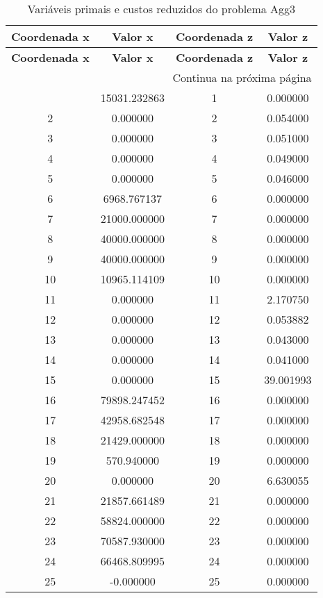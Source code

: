 \documentclass[12pt]{article}
\begin{document}
\begin{longtable}{@{}cccc@{}}
\caption{Variáveis primais e custos reduzidos do problema Agg3} \\
\toprule
\textbf{Coordenada x} & \textbf{Valor x} & \textbf{Coordenada z} & \textbf{Valor z} \\
\midrule
\endfirsthead

\toprule
\textbf{Coordenada x} & \textbf{Valor x} & \textbf{Coordenada z} & \textbf{Valor z} \\
\midrule
\endhead

\midrule \multicolumn{4}{r}{{Continua na próxima página}} \\ \midrule
\endfoot

\bottomrule
\endlastfoot
1 & 15031.232863 & 1 & 0.000000 \\
2 & 0.000000 & 2 & 0.054000 \\
3 & 0.000000 & 3 & 0.051000 \\
4 & 0.000000 & 4 & 0.049000 \\
5 & 0.000000 & 5 & 0.046000 \\
6 & 6968.767137 & 6 & 0.000000 \\
7 & 21000.000000 & 7 & 0.000000 \\
8 & 40000.000000 & 8 & 0.000000 \\
9 & 40000.000000 & 9 & 0.000000 \\
10 & 10965.114109 & 10 & 0.000000 \\
11 & 0.000000 & 11 & 2.170750 \\
12 & 0.000000 & 12 & 0.053882 \\
13 & 0.000000 & 13 & 0.043000 \\
14 & 0.000000 & 14 & 0.041000 \\
15 & 0.000000 & 15 & 39.001993 \\
16 & 79898.247452 & 16 & 0.000000 \\
17 & 42958.682548 & 17 & 0.000000 \\
18 & 21429.000000 & 18 & 0.000000 \\
19 & 570.940000 & 19 & 0.000000 \\
20 & 0.000000 & 20 & 6.630055 \\
21 & 21857.661489 & 21 & 0.000000 \\
22 & 58824.000000 & 22 & 0.000000 \\
23 & 70587.930000 & 23 & 0.000000 \\
24 & 66468.809995 & 24 & 0.000000 \\
25 & -0.000000 & 25 & 0.000000 \\

\end{longtable}
\end{document}

